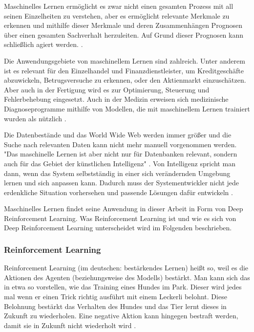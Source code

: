 Maschinelles Lernen ermöglicht es zwar nicht einen gesamten Prozess mit all seinen Einzelheiten zu verstehen, aber es ermöglicht relevante Merkmale zu erkennen und mithilfe dieser Merkmale und deren Zusammenhängen Prognosen über einen gesamten Sachverhalt herzuleiten. Auf Grund dieser Prognosen kann schließlich agiert werden. \cite[Seite 2]{alpaydin_maschinelles_2022}.

Die Anwendungsgebiete von maschinellem Lernen sind zahlreich. Unter anderem ist es relevant für den Einzelhandel und Finanzdienstleister, um Kreditgeschäfte abzuwickeln, Betrugsversuche zu erkennen, oder den Aktienmarkt einzuschätzen. Aber auch in der Fertigung wird es zur Optimierung, Steuerung und Fehlerbehebung eingesetzt. Auch in der Medizin erweisen sich medizinische Diagnoseprogramme mithilfe von Modellen, die mit maschinellem Lernen trainiert wurden als nützlich \cite[Seite 3]{alpaydin_maschinelles_2022}.

Die Datenbestände und das World Wide Web werden immer größer und die Suche nach relevanten Daten kann nicht mehr manuell vorgenommen werden. "Das maschinelle Lernen ist aber nicht nur für Datenbanken relevant, sondern auch für das Gebiet der künstlichen Intelligenz" \cite[Seite 3]{alpaydin_maschinelles_2022}. Von Intelligenz spricht man dann, wenn das System selbstständig in einer sich verändernden Umgebung lernen und sich anpassen kann. Dadurch muss der Systementwickler nicht jede erdenkliche Situation vorhersehen und passende Lösungen dafür entwickeln \cite[Seite 3]{alpaydin_maschinelles_2022}.
 
Maschinelles Lernen findet seine Anwendung in dieser Arbeit in Form von Deep Reinforcement Learning. Was Reinforcement Learning ist und wie es sich von Deep Reinforcement Learning unterscheidet wird im Folgenden beschrieben.
\subsubsection{Reinforcement Learning}
Reinforcement Learning (im deutschen: bestärkendes Lernen) heißt so, weil es die Aktionen des Agenten (beziehungsweise des Modells) bestärkt. Man kann sich das in etwa so vorstellen, wie das Training eines Hundes im Park. Dieser wird jedes mal wenn er einen Trick richtig ausführt mit einem Leckerli belohnt. Diese Belohnung bestärkt das Verhalten des Hundes und das Tier lernt dieses in Zukunft zu wiederholen. Eine negative Aktion kann hingegen bestraft werden, damit sie in Zukunft nicht wiederholt wird \cite[Seite 11]{ris-ala_fundamentals_2023}.

